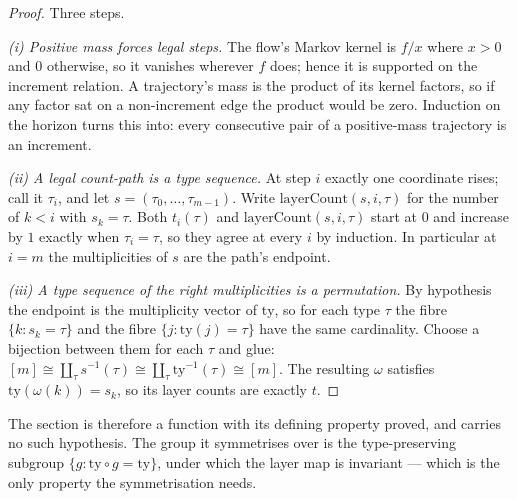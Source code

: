 \begin{proof}
Three steps.

\emph{(i) Positive mass forces legal steps.} The flow's Markov kernel is
$f/x$ where $x>0$ and $0$ otherwise, so it vanishes wherever $f$ does; hence it is
supported on the increment relation. A trajectory's mass is the product of its kernel
factors, so if any factor sat on a non-increment edge the product would be zero. Induction
on the horizon turns this into: every consecutive pair of a positive-mass trajectory is an
increment.

\emph{(ii) A legal count-path is a type sequence.} At step $i$ exactly one coordinate
rises; call it $\tau_{i}$, and let $s=(\tau_{0},\dots,\tau_{m-1})$. Write
$\mathrm{layerCount}(s,i,\tau)$ for the number of $k<i$ with $s_{k}=\tau$. Both
$t_{i}(\tau)$ and $\mathrm{layerCount}(s,i,\tau)$ start at $0$ and increase by $1$ exactly
when $\tau_{i}=\tau$, so they agree at every $i$ by induction. In particular at $i=m$ the
multiplicities of $s$ are the path's endpoint.

\emph{(iii) A type sequence of the right multiplicities is a permutation.} By hypothesis
the endpoint is the multiplicity vector of $\mathrm{ty}$, so for each type $\tau$ the fibre
$\{k:s_{k}=\tau\}$ and the fibre $\{j:\mathrm{ty}(j)=\tau\}$ have the same cardinality.
Choose a bijection between them for each $\tau$ and glue: $[m]\cong\coprod_{\tau}s^{-1}(\tau)
\cong\coprod_{\tau}\mathrm{ty}^{-1}(\tau)\cong[m]$. The resulting $\omega$ satisfies
$\mathrm{ty}(\omega(k))=s_{k}$, so its layer counts are exactly $t$.
\end{proof}

The section is therefore a function with its defining property proved, and
 carries no such hypothesis. The group it
symmetrises over is the type-preserving subgroup $\{g:\mathrm{ty}\circ g=\mathrm{ty}\}$,
under which the layer map is invariant --- which is the only property the symmetrisation
needs.


